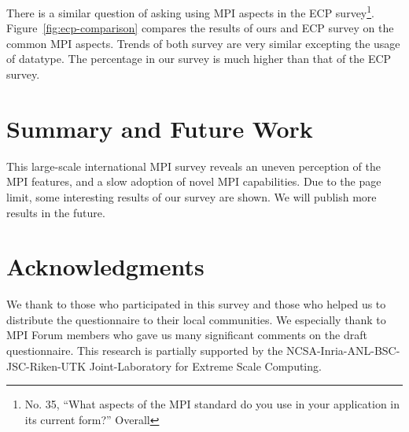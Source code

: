 \documentclass[sigconf,nonacm]{acmart}
\begin{document}
There is a similar question of asking using MPI aspects in the ECP
survey\footnote{No. 35, ``What aspects of the MPI standard do you use
  in your application in its current form?''
  Overall}. Figure~\ref{fig:ecp-comparison} compares the results of
ours and ECP survey on the common MPI aspects. Trends of both survey
are very similar excepting the usage of datatype. The percentage in
our survey is much higher than that of the ECP survey. 

\section{Summary and Future Work}

This large-scale international MPI survey reveals an uneven perception of the
MPI features, and a slow adoption of novel MPI capabilities. Due to
the page limit, some interesting results of our survey are shown. We
will publish more results in the future.

%

\section*{Acknowledgments}
We thank to those who participated in this survey and those who
helped us to distribute the questionnaire to their local
communities. We especially thank to MPI Forum members who gave us many
significant comments on the draft questionnaire.
This research is partially supported by the
NCSA-Inria-ANL-BSC-JSC-Riken-UTK Joint-Laboratory for Extreme Scale
Computing\cite{JLESC}.



\end{document}
